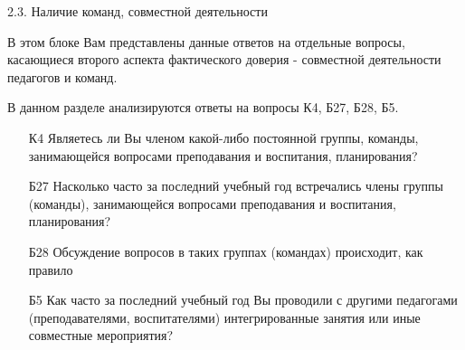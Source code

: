 \begin{frame}{2.3. Наличие команд, совместной деятельности}

\tiny
В этом блоке Вам представлены данные ответов на отдельные вопросы, касающиеся второго аспекта фактического доверия - совместной деятельности педагогов и команд.
\bigskip

В данном разделе анализируются ответы на вопросы К4, Б27, Б28, Б5.
\bigskip

\begin{itemize}

\item [К4] Являетесь ли Вы членом какой-либо постоянной группы, команды, занимающейся вопросами преподавания и воспитания, планирования?

\item [Б27] Насколько часто за последний учебный год встречались члены группы (команды), занимающейся вопросами преподавания и воспитания, планирования?

\item [Б28] Обсуждение вопросов в таких группах (командах) происходит, как правило

\item [Б5] Как часто за последний учебный год  Вы проводили с другими педагогами  (преподавателями, воспитателями) интегрированные занятия или иные совместные мероприятия?

\end{itemize}

\end{frame}


